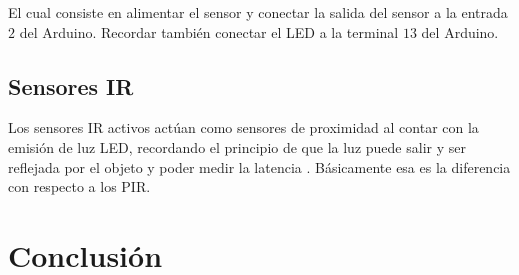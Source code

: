 \documentclass[conference]{IEEEtran}
\begin{document}
El cual consiste en alimentar el sensor y conectar la salida del sensor a la entrada $2$ del Arduino. Recordar también conectar el LED a la terminal $13$ del Arduino.

\subsection{Sensores IR}

Los sensores IR activos actúan como sensores de proximidad al contar con la emisión de luz LED, recordando el principio de que la luz puede salir y ser reflejada por el objeto  y poder medir la latencia . Básicamente esa es la diferencia con respecto a los PIR.


\section{Conclusión}


\printbibliography
\end{document}
